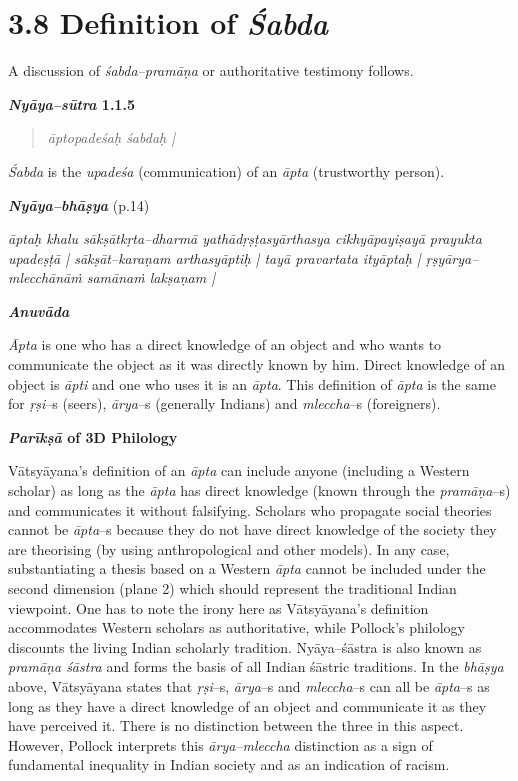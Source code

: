 \vspace{-.3cm}

\section*{3.8 Definition of {\it {\bfseries Śabda}}}

A discussion of \textit{śabda–pramāṇa }or authoritative testimony follows.

\textbf{\textit{Nyāya–sūtra} 1.1.5}

\vspace{-.3cm}

\begin{verse}
\textit{āptopadeśaḥ śabdaḥ |}
\end{verse}

\vspace{-.3cm}

\textit{Śabda} is the \textit{upadeśa} (communication) of an \textit{āpta} (trustworthy person).

\textit{\textbf{Nyāya–bhāṣya}} (p.14)

\begin{myquote}
\textit{āptaḥ khalu sākṣātkṛta–dharmā yathādṛṣṭasyārthasya cikhyāpayiṣayā prayukta upadeṣṭā | sākṣāt–karaṇam arthasyāptiḥ | tayā pravartata ityāptaḥ | ṛṣyārya–mlecchānāṁ samānaṁ lakṣaṇam |}
\end{myquote}

\textit{\textbf{Anuvāda}}

\textit{Āpta} is one who has a direct knowledge of an object and who wants to communicate the object as it was directly known by him. Direct knowledge of an object is \textit{āpti} and one who uses it is an \textit{āpta}. This definition of \textit{āpta} is the same for \textit{ṛṣi}–s (seers), \textit{ārya}–s (generally Indians) and \textit{mleccha}–s (foreigners).

\textbf{\textit{Parīkṣā} of 3D Philology}

Vātsyāyana’s definition of an \textit{āpta} can include anyone (including a Western scholar) as long as the \textit{āpta }has direct knowledge (known through the \textit{pramāṇa}–s) and communicates it without falsifying. Scholars who propagate social theories cannot be \textit{āpta}–s because they do not have direct knowledge of the society they are theorising (by using anthropological and other models). In any case, substantiating a thesis based on a Western \textit{āpta} cannot be included under the second dimension (plane 2) which should represent the traditional Indian viewpoint. One has to note the irony here as Vātsyāyana’s definition accommodates Western scholars as authoritative, while Pollock’s philology discounts the living Indian scholarly tradition. Nyāya–śāstra is also known as \textit{pramāṇa śāstra }and forms the basis of all Indian śāstric traditions. In the \textit{bhāṣya} above, Vātsyāyana states that \textit{ṛṣi}–s, \textit{ārya}–s and \textit{mleccha}–s can all be \textit{āpta}–s as long as they have a direct knowledge of an object and communicate it as they have perceived it. There is no distinction between the three in this aspect. However, Pollock interprets this \textit{ārya–mleccha }distinction as a sign of fundamental inequality in Indian society and as an indication of racism.

